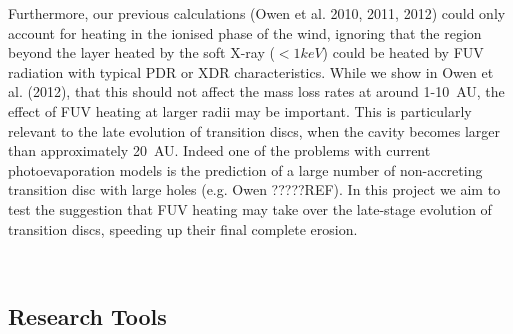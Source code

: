 \documentclass[10pt,fleqn,twoside]{article}
\begin{document}
Furthermore, our previous calculations (Owen et al. 2010, 2011, 2012)
could only account for heating 
in the ionised phase of the wind, ignoring that the region beyond the
layer heated by the soft X-ray ($<1keV$) could be heated by FUV
radiation with typical PDR or XDR characteristics. While we show in
Owen et al. (2012), that this should not affect the mass loss rates at
around 1-10~AU, the effect of FUV heating at larger radii may be
important. This is particularly relevant to the late evolution of
transition discs, when the cavity becomes larger than approximately
20~AU. Indeed one of the
problems with current photoevaporation models is the prediction of a
large number of non-accreting transition disc with large holes
(e.g. Owen ?????REF). In this project we aim to test the
suggestion that FUV heating may take over the late-stage evolution of
transition discs, speeding up their final complete erosion. 


\\ 

\subsection{Research Tools}
\end{document}
